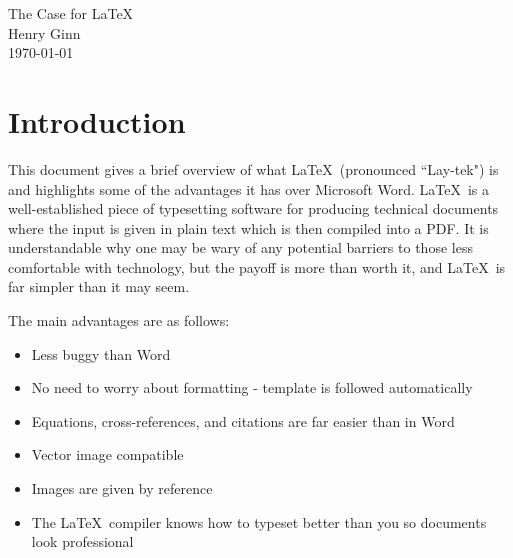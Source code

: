 	
\begin{center}
	\huge The Case for \LaTeX\  \\
	\vspace{5mm}
	\large Henry Ginn  \\
	\vspace{3 mm}
	\large \today
\end{center}

\section{Introduction}
\label{Introduction}

This document gives a brief overview of what \LaTeX\ (pronounced ``Lay-tek") is and highlights some of the advantages it has over Microsoft Word. \LaTeX\ is a well-established piece of typesetting software for producing technical documents where the input is given in plain text which is then compiled into a PDF. It is understandable why one may be wary of any potential barriers to those less comfortable with technology, but the payoff is more than worth it, and \LaTeX\ is far simpler than it may seem.

The main advantages are as follows:

\begin{itemize}
	\item Less buggy than Word
	\item No need to worry about formatting - template is followed automatically
	\item Equations, cross-references, and citations are far easier than in Word
	\item Vector image compatible
	\item Images are given by reference
	\item The \LaTeX\ compiler knows how to typeset better than you so documents look professional
\end{itemize}

